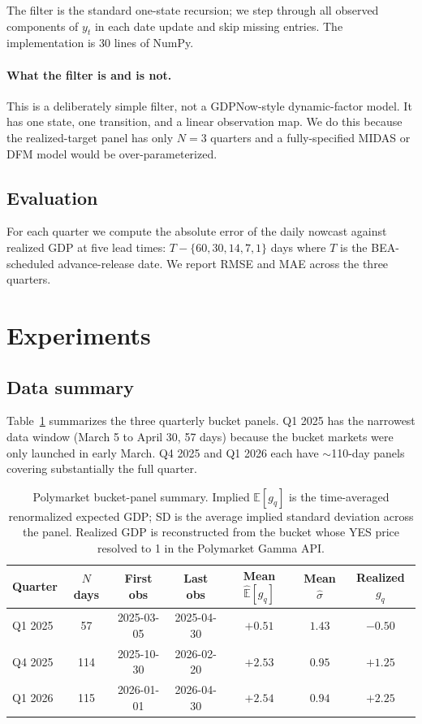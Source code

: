 \documentclass{article}
\begin{document}
The filter is the standard one-state recursion; we step through all observed components of
$y_t$ in each date update and skip missing entries. The implementation is 30 lines of
NumPy.

\paragraph{What the filter is and is not.} This is a deliberately simple filter, not a
GDPNow-style dynamic-factor model. It has one state, one transition, and a linear
observation map. We do this because the realized-target panel has only $N=3$ quarters
and a fully-specified MIDAS or DFM model would be over-parameterized.

\subsection{Evaluation}
For each quarter we compute the absolute error of the daily nowcast against realized GDP
at five lead times: $T-\{60,30,14,7,1\}$ days where $T$ is the BEA-scheduled
advance-release date. We report RMSE and MAE across the three quarters.

\section{Experiments}
\label{sec:experiments}

\subsection{Data summary}
\label{sec:experiments:data}
Table~\ref{tab:data} summarizes the three quarterly bucket panels. Q1 2025 has the
narrowest data window (March 5 to April 30, 57 days) because the bucket markets were only
launched in early March. Q4 2025 and Q1 2026 each have $\sim$110-day panels covering
substantially the full quarter.

\begin{table}[h!]
\centering
\caption{Polymarket bucket-panel summary.  Implied $\mathbb{E}[g_q]$ is the time-averaged
renormalized expected GDP; SD is the average implied standard deviation across the panel.
Realized GDP is reconstructed from the bucket whose YES price resolved to 1 in the
Polymarket Gamma API.}
\label{tab:data}
\small
\begin{tabular}{lcccccc}
\toprule
Quarter & $N$ days & First obs & Last obs & Mean $\widehat{\mathbb{E}}[g_q]$ &
Mean $\widehat{\sigma}$ & Realized $g_q$ \\
\midrule
Q1 2025 & 57  & 2025-03-05 & 2025-04-30 & $+0.51$ & $1.43$ & $-0.50$ \\
Q4 2025 & 114 & 2025-10-30 & 2026-02-20 & $+2.53$ & $0.95$ & $+1.25$ \\
Q1 2026 & 115 & 2026-01-01 & 2026-04-30 & $+2.54$ & $0.94$ & $+2.25$ \\
\bottomrule
\end{tabular}
\end{table}
\end{document}
